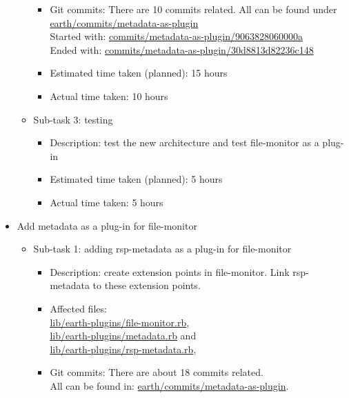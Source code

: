 \begin{itemize}
\begin{itemize}
\begin{itemize}
				\item Git commits: There are 10 commits related. All can be found under \href{http://github.com/mfbDev/earth/commits/metadata_as_plugin}{earth/commits/metadata-as-plugin}\\
Started with: \href{http://github.com/mfbDev/earth/commits/metadata_as_plugin/9063828060000a}{commits/metadata-as-plugin/9063828060000a} \\
Ended with: \href{http://github.com/mfbDev/earth/commits/metadata_as_plugin/30d8813d82236c148}{commits/metadata-as-plugin/30d8813d82236c148}
				\item Estimated time taken (planned): 15 hours
				\item Actual time taken: 10 hours
			\end{itemize}
		\item Sub-task 3: testing
			\begin{itemize}
				\item Description: test the new architecture and test file-monitor as a plug-in
				\item Estimated time taken (planned): 5 hours
				\item Actual time taken: 5 hours 
			\end{itemize}
		\end{itemize}
	\item Add metadata as a plug-in for file-monitor
		\begin{itemize}
			\item Sub-task 1: adding rsp-metadata as a plug-in for file-monitor
				\begin{itemize}
					\item Description: create extension points in file-monitor. Link rsp-metadata to these extension points.
					\item Affected files:\\
\href{http://github.com/mfbDev/earth/tree/master/lib/earth_plugins/file_monitor.rb}{lib/earth-plugins/file-monitor.rb},\\ 
\href{http://github.com/mfbDev/earth/tree/master/lib/earth_plugins/metadata.rb}{lib/earth-plugins/metadata.rb} and \\
\href{http://github.com/mfbDev/earth/tree/master/lib/earth_plugins/rsp_metadata.rb}{lib/earth-plugins/rsp-metadata.rb},
					\item Git commits: There are about 18 commits related.\\
All can be found in: \href{http://github.com/mfbDev/earth/commits/metadata_as_plugin}{earth/commits/metadata-as-plugin}.\\

\end{itemize}
\end{itemize}
\end{itemize}
